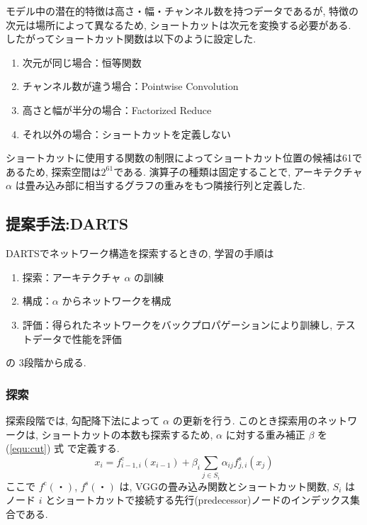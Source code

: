 モデル中の潜在的特徴は高さ・幅・チャンネル数を持つデータであるが,
特徴の次元は場所によって異なるため, ショートカットは次元を変換する必要がある.
したがってショートカット関数は以下のように設定した.
\begin{enumerate}
  \item 次元が同じ場合：恒等関数
  \item チャンネル数が違う場合：Pointwise Convolution
  \item 高さと幅が半分の場合：Factorized Reduce
  \item それ以外の場合：ショートカットを定義しない
\end{enumerate}
ショートカットに使用する関数の制限によってショートカット位置の候補は61であるため,
探索空間は$2^{61}$である.
演算子の種類は固定することで, アーキテクチャ $\alpha$ は畳み込み部に相当するグラフの重みをもつ隣接行列と定義した.


\changeindent{0cm}
\subsection{提案手法:DARTS}
\label{sec:pred.01}
\changeindent{2cm}

DARTSでネットワーク構造を探索するときの, 学習の手順は
\begin{enumerate}
  \item 探索：アーキテクチャ $\alpha$ の訓練
  \item 構成：$\alpha$ からネットワークを構成
  \item 評価：得られたネットワークをバックプロパゲーションにより訓練し, テストデータで性能を評価
\end{enumerate}
の 3段階から成る.

\subsubsection{探索}

探索段階では, 勾配降下法によって $\alpha$ の更新を行う.
このとき探索用のネットワークは, ショートカットの本数も探索するため,
$\alpha$ に対する重み補正 $\beta$ を (\ref{equ:cut}) 式 で定義する.
\begin{equation}
  \label{equ:cut}
  x_i = f^{\mathrm{c}}_{i-1, i}(x_{i-1}) + \beta_i \sum_{j \in S_i} \alpha_{ij} f^{\mathrm{s}}_{j, i} (x_j)
\end{equation}
ここで $f^{\mathrm{c}}(・)$, $f^{\mathrm{s}}(・)$ は, VGGの畳み込み関数とショートカット関数,
$S_i$ はノード $i$ とショートカットで接続する先行(predecessor)ノードのインデックス集合である.

